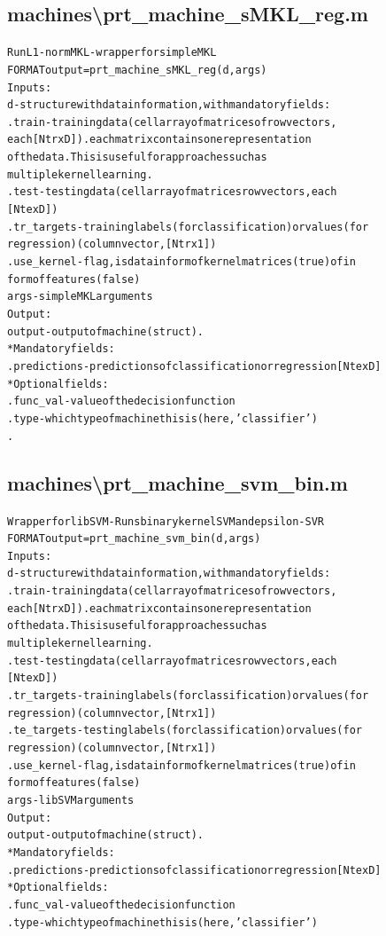 \subsection{machines\textbackslash prt\_machine\_sMKL\_reg.m}
\begin{alltt}

 Run L1-norm MKL - wrapper for simpleMKL
 FORMAT output = prt\_machine\_sMKL\_reg(d,args)
 Inputs:
   d         - structure with data information, with mandatory fields:
     .train      - training data (cell array of matrices of row vectors,
                   each [Ntr x D]). each matrix contains one representation
                   of the data. This is useful for approaches such as
                   multiple kernel learning.
     .test       - testing data  (cell array of matrices row vectors, each
                   [Nte x D])
     .tr\_targets - training labels (for classification) or values (for
                   regression) (column vector, [Ntr x 1])
     .use\_kernel - flag, is data in form of kernel matrices (true) of in 
                form of features (false)
    args     - simpleMKL arguments
 Output:
    output  - output of machine (struct).
     * Mandatory fields:
      .predictions - predictions of classification or regression [Nte x D]
     * Optional fields:
      .func\_val - value of the decision function
      .type     - which type of machine this is (here, 'classifier')
      .
\end{alltt}


\subsection{machines\textbackslash prt\_machine\_svm\_bin.m}
\begin{alltt}

 Wrapper for libSVM - Runs binary kernel SVM and epsilon-SVR
 FORMAT output = prt\_machine\_svm\_bin(d,args)
 Inputs:
   d         - structure with data information, with mandatory fields:
     .train      - training data (cell array of matrices of row vectors,
                   each [Ntr x D]). each matrix contains one representation
                   of the data. This is useful for approaches such as
                   multiple kernel learning.
     .test       - testing data  (cell array of matrices row vectors, each
                   [Nte x D])
     .tr\_targets - training labels (for classification) or values (for
                   regression) (column vector, [Ntr x 1])
     .te\_targets - testing labels (for classification) or values (for
                   regression) (column vector, [Ntr x 1])
     .use\_kernel - flag, is data in form of kernel matrices (true) of in 
                form of features (false)
    args     - libSVM arguments
 Output:
    output  - output of machine (struct).
     * Mandatory fields:
      .predictions - predictions of classification or regression [Nte x D]
     * Optional fields:
      .func\_val - value of the decision function
      .type     - which type of machine this is (here, 'classifier')
\end{alltt}


